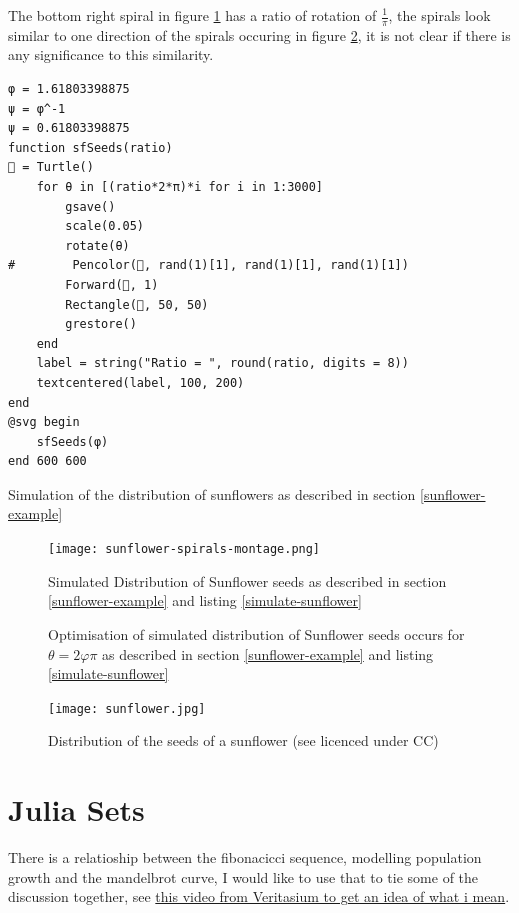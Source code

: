 \documentclass[11pt]{article}
\begin{document}
The bottom right spiral in figure \ref{simulate-sunflower-image} has a ratio of rotation of \(\frac{1}{\pi}\), the spirals look similar to one direction of the spirals occuring in figure \ref{simulate-sunflower-phi}, it is not clear if there is any significance to this similarity.

\begin{listing}[htbp]
\begin{verbatim}
φ = 1.61803398875
ψ = φ^-1
ψ = 0.61803398875
function sfSeeds(ratio)
🐢 = Turtle()
    for θ in [(ratio*2*π)*i for i in 1:3000]
        gsave()
        scale(0.05)
        rotate(θ)
#        Pencolor(🐢, rand(1)[1], rand(1)[1], rand(1)[1])
        Forward(🐢, 1)
        Rectangle(🐢, 50, 50)
        grestore()
    end
    label = string("Ratio = ", round(ratio, digits = 8))
    textcentered(label, 100, 200)
end
@svg begin
    sfSeeds(φ)
end 600 600
\end{verbatim}
\caption{\label{simulate-sunflower}Simulation of the distribution of sunflowers as described in section \ref{sunflower-example}}
\end{listing}

\begin{figure}[htbp]
\centering
\texttt{[image: sunflower-spirals-montage.png]}
\caption{\label{simulate-sunflower-image}Simulated Distribution of Sunflower seeds as described in section \ref{sunflower-example} and listing \ref{simulate-sunflower}}
\end{figure}

\begin{figure}[htbp]
\centering

\caption{\label{simulate-sunflower-phi}Optimisation of simulated distribution of Sunflower seeds occurs for \(\theta =2 \varphi  \pi\) as described in section \ref{sunflower-example} and listing \ref{simulate-sunflower}}
\end{figure}


\begin{figure}[htbp]
\centering
\texttt{[image: sunflower.jpg]}
\caption{\label{sunflower}Distribution of the seeds of a sunflower (see \cite{simonbrassCCSearch2006} licenced under CC)}
\end{figure}

\section{Julia Sets}
\label{sec:orgfd4ed85}

There is a relatioship between the fibonacicci sequence, modelling population growth and the mandelbrot curve, I would like to use that to tie some of the discussion together, see \href{https://youtu.be/ovJcsL7vyrk}{this video from Veritasium to get an idea of what i mean}.
\end{document}
